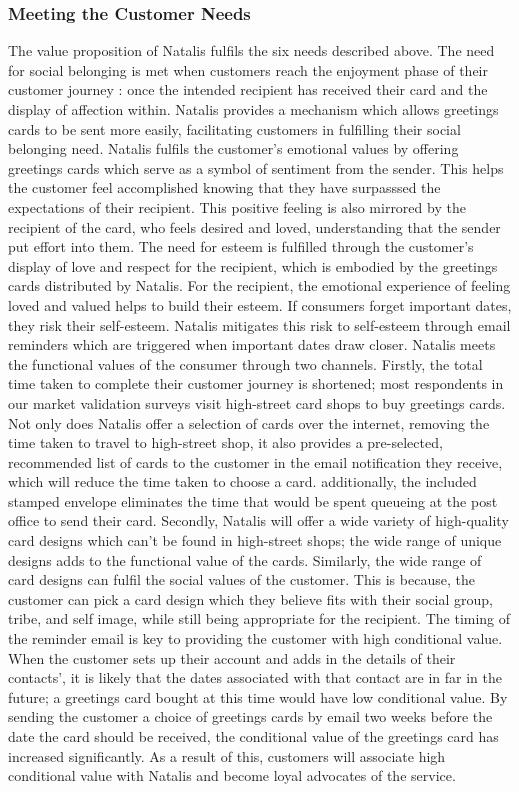 \subsubsection*{Meeting the Customer Needs}
The value proposition of Natalis fulfils the six needs described above.
The need for social belonging is met when customers reach the enjoyment phase of their customer journey \citep{edelman2015competing}: once the intended recipient has received their card and the display of affection within. Natalis provides a mechanism which allows greetings cards to be sent more easily, facilitating customers in fulfilling their social belonging need.
Natalis fulfils the customer's emotional values by offering greetings cards which serve as a symbol of sentiment from the sender. This helps the customer feel accomplished knowing that they have surpasssed the expectations of their recipient. This positive feeling is also mirrored by the recipient of the card, who feels desired and loved, understanding that the sender put effort into them.
The need for esteem is fulfilled through the customer's display of love and respect for the recipient, which is embodied by the greetings cards distributed by Natalis. For the recipient, the emotional experience of feeling loved and valued helps to build their esteem. If consumers forget important dates, they risk their self-esteem. Natalis mitigates this risk to self-esteem through email reminders which are triggered when important dates draw closer.
Natalis meets the functional values of the consumer through two channels. Firstly, the total time taken to complete their customer journey is shortened; most respondents in our market validation surveys visit high-street card shops to buy greetings cards. Not only does Natalis offer a selection of cards over the internet, removing the time taken to travel to high-street shop, it also provides a pre-selected, recommended list of cards to the customer in the email notification they receive, which will reduce the time taken to choose a card. additionally, the included stamped envelope eliminates the time that would be spent queueing at the post office to send their card. Secondly, Natalis will offer a wide variety of high-quality card designs which can't be found in high-street shops; the wide range of unique designs adds to the functional value of the cards.
Similarly, the wide range of card designs can fulfil the social values of the customer. This is because, the customer can pick a card design which they believe fits with their social group, tribe, and self image, while still being appropriate for the recipient.
The timing of the reminder email is key to providing the customer with high conditional value. When the customer sets up their account and adds in the details of their contacts', it is likely that the dates associated with that contact are in far in the future; a greetings card bought at this time would have low conditional value. By sending the customer a choice of greetings cards by email two weeks before the date the card should be received, the conditional value of the greetings card has increased significantly. As a result of this, customers will associate high conditional value with Natalis and become loyal advocates of the service.
